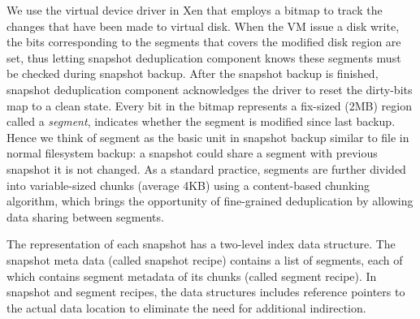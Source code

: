We use the virtual device driver in Xen that employs a bitmap to track the changes 
that have been made to virtual disk.
When the VM issue a disk write, the bits corresponding to the segments that covers 
the modified disk region are set, thus letting snapshot deduplication component knows these
segments must be checked during snapshot backup. After the snapshot backup is finished, 
snapshot deduplication component acknowledges the driver to reset the dirty-bits map to
a clean state.
Every bit in the bitmap represents a fix-sized (2MB) region called a \textit{segment}, indicates whether the segment
is modified since last backup. Hence we think of segment as the basic unit 
in snapshot backup similar to
file in normal filesystem backup: a snapshot could share a segment with previous snapshot it is not changed. 
As a standard practice, segments are further divided into variable-sized chunks (average 4KB) 
using a content-based chunking algorithm, which brings the opportunity of fine-grained deduplication by
allowing data sharing between segments.

The representation of each snapshot has  a two-level index data structure.
The snapshot meta data (called snapshot recipe) contains a list of segments, each of which contains segment
metadata of its chunks (called segment recipe).
In snapshot and segment recipes, 
the data structures  includes reference pointers to the actual data location to eliminate the need for additional indirection.





